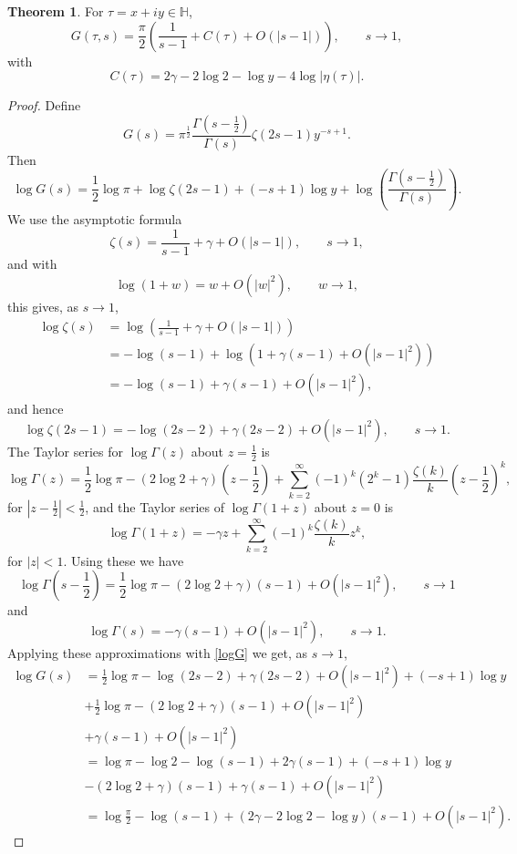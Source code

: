 \documentclass{article}
\theoremstyle{definition}
\newtheorem{theorem}{Theorem}
\theoremstyle{definition}
\begin{document}
\begin{theorem}
For $\tau =x+iy \in \mathbb{H}$,
\[
G(\tau,s) = \frac{\pi}{2}\left(\frac{1}{s-1}+C(\tau)+O(|s-1|)\right), \qquad s \to 1,
\]
with
\[
C(\tau)=2\gamma-2\log 2-\log y - 4 \log|\eta(\tau)|.
\]
\end{theorem}
\begin{proof}
Define
\[
G(s) = \pi^{\frac{1}{2}} \frac{\Gamma\left(s-\frac{1}{2}\right)}{\Gamma(s)} \zeta(2s-1) y^{-s+1}.
\]
Then
\begin{equation}
\log G(s)=\frac{1}{2}\log \pi+\log \zeta(2s-1)+(-s+1)\log y +\log\left( \frac{\Gamma\left(s-\frac{1}{2}\right)}{\Gamma(s)} \right).
\label{logG}
\end{equation}
We use the asymptotic formula
\[
\zeta(s)= \frac{1}{s-1}+\gamma+O(|s-1|), \qquad s \to 1,
\]
and with
\[
\log(1+w)=w+O(|w|^2), \qquad w \to 1,
\]
this gives,
as $s \to 1$,
\begin{align*}
\log \zeta(s) &=  \log\left(\frac{1}{s-1}+\gamma+O(|s-1|)\right)\\
&=-\log(s-1)+\log(1+\gamma(s-1)+O(|s-1|^2))\\
&=-\log(s-1)+\gamma(s-1)+O(|s-1|^2),
\end{align*}
and hence
\[
\log \zeta(2s-1) = -\log(2s-2)+\gamma(2s-2)+O(|s-1|^2), \qquad s \to 1.
\]
The Taylor series for $\log \Gamma(z)$ about $z=\frac{1}{2}$ is
\[
\log \Gamma(z) = \frac{1}{2} \log \pi - (2\log 2+\gamma)\left(z-\frac{1}{2}\right)
+\sum_{k=2}^\infty (-1)^k (2^k-1) \frac{\zeta(k)}{k} \left(z-\frac{1}{2}\right)^k,
\]
for $|z-\frac{1}{2}|<\frac{1}{2}$, and the Taylor series of $\log \Gamma(1+z)$ about $z=0$ is
\[
\log \Gamma(1+z) = -\gamma z + \sum_{k=2}^\infty (-1)^k \frac{\zeta(k)}{k} z^k,
\]
for $|z|<1$. Using these we have
\[
\log \Gamma\left(s-\frac{1}{2}\right) = \frac{1}{2}\log \pi - (2\log 2 +\gamma)(s-1)
+O(|s-1|^2), \qquad s \to 1
\]
and
\[
\log \Gamma(s) = -\gamma(s-1)+O(|s-1|^2), \qquad s \to 1.
\]
Applying these approximations with \eqref{logG} we get, as $s \to 1$,
\begin{align*}
\log G(s)&=\frac{1}{2}\log \pi-\log(2s-2)+\gamma(2s-2)+O(|s-1|^2)+(-s+1)\log y\\
&+\frac{1}{2}\log \pi - (2\log 2 +\gamma)(s-1)
+O(|s-1|^2)\\
&+\gamma(s-1)+O(|s-1|^2)\\
&=\log \pi  - \log 2 - \log(s-1) + 2\gamma(s-1)+(-s+1)\log y\\
&-(2\log 2+\gamma)(s-1)+\gamma(s-1)+O(|s-1|^2)\\
&=\log \frac{\pi}{2} - \log (s-1) + (2\gamma-2\log 2-\log y)(s-1)+O(|s-1|^2).

\end{align*}
\end{proof}
\end{document}
